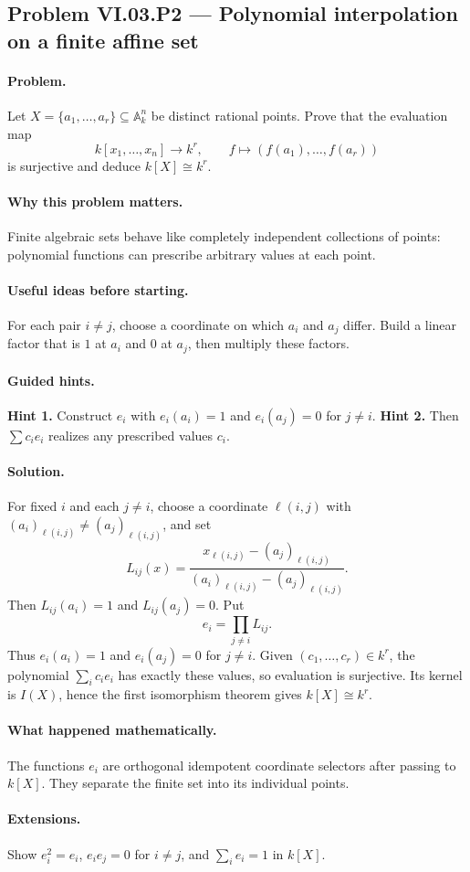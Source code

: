\subsection*{Problem VI.03.P2 --- Polynomial interpolation on a finite affine set}
\label{prob:vi03-p2}
\paragraph{Problem.}
Let \(X=\{a_1,\dots,a_r\}\subseteq\mathbb A_k^n\) be distinct rational points.  Prove that
the evaluation map
\[
k[x_1,\dots,x_n]\to k^r,
\qquad f\mapsto(f(a_1),\dots,f(a_r))
\]
is surjective and deduce \(k[X]\cong k^r\).
\ifdefined\FullProblemDossiers
\paragraph{Why this problem matters.}
Finite algebraic sets behave like completely independent collections of points: polynomial
functions can prescribe arbitrary values at each point.
\paragraph{Useful ideas before starting.}
For each pair \(i\neq j\), choose a coordinate on which \(a_i\) and \(a_j\) differ.  Build a
linear factor that is \(1\) at \(a_i\) and \(0\) at \(a_j\), then multiply these factors.
\paragraph{Guided hints.}
\textbf{Hint 1.} Construct \(e_i\) with \(e_i(a_i)=1\) and \(e_i(a_j)=0\) for \(j\neq i\).
\textbf{Hint 2.} Then \(\sum c_i e_i\) realizes any prescribed values \(c_i\).
\paragraph{Solution.}
For fixed \(i\) and each \(j\neq i\), choose a coordinate \(\ell(i,j)\) with
\((a_i)_{\ell(i,j)}\neq(a_j)_{\ell(i,j)}\), and set
\[
L_{ij}(x)=\frac{x_{\ell(i,j)}-(a_j)_{\ell(i,j)}}{(a_i)_{\ell(i,j)}-(a_j)_{\ell(i,j)}}.
\]
Then \(L_{ij}(a_i)=1\) and \(L_{ij}(a_j)=0\).  Put
\[
e_i=\prod_{j\neq i}L_{ij}.
\]
Thus \(e_i(a_i)=1\) and \(e_i(a_j)=0\) for \(j\neq i\).  Given
\((c_1,\dots,c_r)\in k^r\), the polynomial \(\sum_i c_i e_i\) has exactly these values, so
evaluation is surjective.  Its kernel is \(I(X)\), hence the first isomorphism theorem gives
\(k[X]\cong k^r\).
\paragraph{What happened mathematically.}
The functions \(e_i\) are orthogonal idempotent coordinate selectors after passing to
\(k[X]\).  They separate the finite set into its individual points.
\paragraph{Extensions.}
Show \(e_i^2=e_i\), \(e_ie_j=0\) for \(i\neq j\), and \(\sum_i e_i=1\) in \(k[X]\).
\fi
